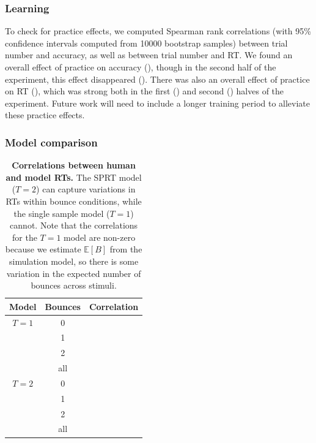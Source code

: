 \documentclass[10pt,letterpaper]{article}
\begin{document}
\subsubsection{Learning}

To check for practice effects, we computed Spearman rank correlations (with 95\% confidence intervals computed from 10000 bootstrap samples) between trial number and accuracy, as well as between trial number and RT.
We found an overall effect of practice on accuracy (\ResponseTrialCorr{}), though in the second half of the experiment, this effect disappeared (\ResponseTrialCorrLate{}).
There was also an overall effect of practice on RT (\RTTrialCorr{}), which was strong both in the first (\RTTrialCorrEarly{}) and second (\RTTrialCorrLate{}) halves of the experiment.
Future work will need to include a longer training period to alleviate these practice effects.

\subsubsection{Model comparison}

\begin{table}
    \centering
    \begin{tabular}{ccl}
    \toprule
    \textbf{Model} & \textbf{Bounces} & \textbf{Correlation} \\
    \midrule
    $T=1$ & 0   & \NoSamplesHoleRTCorrZeroBounces{} \\
          & 1   & \NoSamplesHoleRTCorrOneBounce{} \\
          & 2   & \NoSamplesHoleRTCorrTwoBounces{} \\
          & all & \NoSamplesHoleRTCorr{} \\
    \midrule
    $T=2$ & 0   & \HoleRTCorrZeroBounces{} \\
          & 1   & \HoleRTCorrOneBounce{} \\
          & 2   & \HoleRTCorrTwoBounces{} \\
          & all & \HoleRTCorr{} \\
    \bottomrule
    \end{tabular}
    \vspace{.25cm}
    \caption{\textbf{Correlations between human and model RTs.} The SPRT model ($T=2$) can capture variations in RTs within bounce conditions, while the single sample model ($T=1$) cannot. Note that the correlations for the $T=1$ model are non-zero because we estimate $\mathbb{E}[B]$ from the simulation model, so there is some variation in the expected number of bounces across stimuli.}
    \label{tbl:rt}
\end{table}
\end{document}
